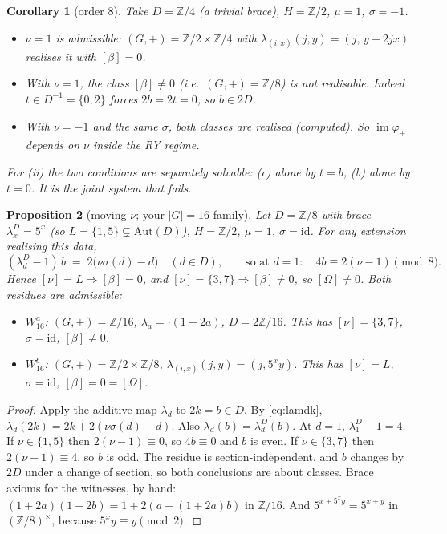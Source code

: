 \documentclass[11pt]{article}
\newtheorem{proposition}{Proposition}
\newtheorem{corollary}[proposition]{Corollary}
\theoremstyle{remark}
\newcommand{\Z}{\mathbb Z}
\newcommand{\Aut}{\mathrm{Aut}}
\begin{document}
\begin{corollary}[order 8]\label{cor:O8}
Take $D=\Z/4$ (a trivial brace), $H=\Z/2$, $\mu=1$, $\sigma=-1$.
\begin{itemize}
\item[(i)] $\nu=1$ is admissible: $(G,+)=\Z/2\times\Z/4$ with $\lambda_{(i,x)}(j,y)=(j,\,y+2jx)$ realises it with $[\beta]=0$.
\item[(ii)] With $\nu=1$, the class $[\beta]\ne0$ (i.e.\ $(G,+)=\Z/8$) is \emph{not} realisable. Indeed
  $t\in D^{-1}=\{0,2\}$ forces $2b=2t=0$, so $b\in2D$.
\item[(iii)] With $\nu=-1$ and the same $\sigma$, both classes are realised (computed). So
$\operatorname{im}\varphi_+$ depends on $\nu$ inside the RY regime.
\end{itemize}
For (ii) the two conditions are separately solvable: (c) alone by $t=b$, (b) alone by $t=0$. It is the \emph{joint} system that fails.
\end{corollary}

\begin{proposition}[moving $\nu$; your $|G|=16$ family]\label{prop:B}
Let $D=\Z/8$ with brace $\lambda^D_x=5^x$ (so $L=\{1,5\}\subsetneq\Aut(D)$), $H=\Z/2$, $\mu=1$, $\sigma=\mathrm{id}$.
For any extension realising this data,
\[
(\lambda^D_d-1)\,b \;=\; 2\bigl(\nu\sigma(d)-d\bigr)\quad(d\in D),\qquad\text{so at }d=1:\quad 4b\equiv 2(\nu-1)\pmod 8 .
\]
Hence $[\nu]=L\Rightarrow[\beta]=0$, and $[\nu]=\{3,7\}\Rightarrow[\beta]\ne0$, so $[\Omega]\ne0$.
Both residues are admissible:
\begin{itemize}
\item $W_{16}^{a}$: $(G,+)=\Z/16$, $\lambda_a=\cdot(1+2a)$, $D=2\Z/16$. This has $[\nu]=\{3,7\}$, $\sigma=\mathrm{id}$, $[\beta]\neq0$.
\item $W_{16}^{b}$: $(G,+)=\Z/2\times\Z/8$, $\lambda_{(i,x)}(j,y)=(j,5^xy)$. This has $[\nu]=L$, $\sigma=\mathrm{id}$, $[\beta]=0=[\Omega]$.
\end{itemize}
\end{proposition}
\begin{proof}
Apply the additive map $\lambda_d$ to $2k=b\in D$. By \eqref{eq:lamdk}, $\lambda_d(2k)=2k+2(\nu\sigma(d)-d)$. Also
$\lambda_d(b)=\lambda^D_d(b)$. At $d=1$, $\lambda^D_1-1=4$. If $\nu\in\{1,5\}$ then $2(\nu-1)\equiv0$, so $4b\equiv0$ and $b$ is
even. If $\nu\in\{3,7\}$ then $2(\nu-1)\equiv4$, so $b$ is odd. The residue is section-independent, and $b$ changes by
$2D$ under a change of section, so both conclusions are about classes. Brace axioms for the witnesses, by hand:
$(1+2a)(1+2b)=1+2(a+(1+2a)b)$ in $\Z/16$. And $5^{x+5^xy}=5^{x+y}$ in $(\Z/8)^\times$, because $5^xy\equiv y\pmod 2$.
\end{proof}
\end{document}
